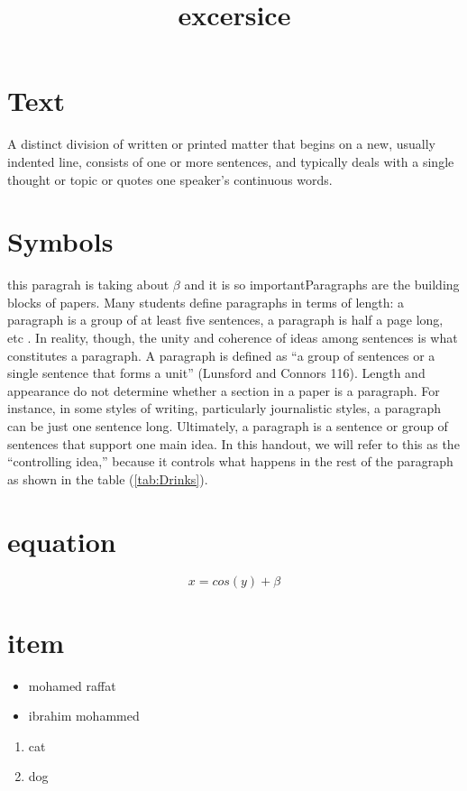\documentclass[twocolumn]{article}
\title{excersice}
\date{}
\begin{document}
	\maketitle
		\section{Text}
	A distinct division of written or printed matter that begins on a new, usually indented line, consists of one or more sentences, and typically deals with a single thought or topic or quotes one speaker's continuous words. 
	\section{Symbols}
	this paragrah is taking about $\beta$ and it is so importantParagraphs are the building blocks of papers. Many students define paragraphs in terms of length: a paragraph is a group of at least five sentences, a paragraph is half a page long, etc \cite{pv}. In reality, though, the unity and coherence of ideas among sentences is what constitutes a paragraph. A paragraph is defined as “a group of sentences or a single sentence that forms a unit” (Lunsford and Connors 116). Length and appearance do not determine whether a section in a paper is a paragraph. For instance, in some styles of writing, particularly journalistic styles, a paragraph can be just one sentence long. Ultimately, a paragraph is a sentence or group of sentences that support one main idea. In this handout, we will refer to this as the “controlling idea,” because it controls what happens in the rest of the paragraph as shown in the table (\ref{tab:Drinks}).
\section{equation}
	\begin{equation*}
		x=cos(y)+\beta
\end{equation*}
\section{item}
	\begin{itemize}
		\item mohamed raffat
		\item ibrahim mohammed
\end{itemize}
\begin{enumerate}
		\item cat
		\item dog
\end{enumerate}
\end{document}
